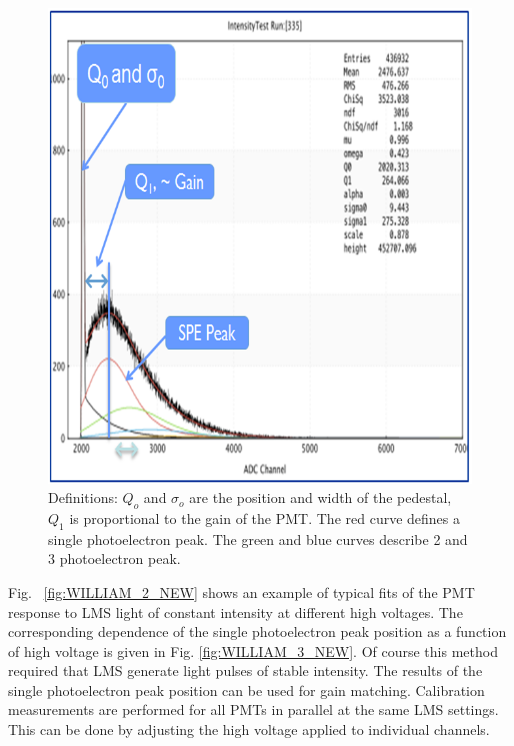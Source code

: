 \begin{figure}[!h]
    \centering
    \includegraphics[width=1.0\linewidth,trim={0.0cm 0.0cm 0.0cm 0.0cm},clip]{images/WILLIAM_1.png}
    \caption{Definitions: $Q_{o}$ and $\sigma_{o}$ are the position and width of the pedestal, $Q_{ 1}$ is proportional to the gain of the PMT. The red curve defines a single photoelectron peak. The green and blue curves describe 2 and 3 photoelectron peak.}
    \label{fig:WILLIAM_1}
\end{figure}

Fig. ~\ref{fig:WILLIAM_2_NEW} shows an example of typical fits of the PMT response to LMS light of constant intensity at different high voltages. The corresponding dependence of the single photoelectron peak position as a function of high voltage is given in Fig. \ref{fig:WILLIAM_3_NEW}. Of course this method required that LMS generate light pulses of stable intensity. The results of the single photoelectron peak position can be used for gain matching. Calibration measurements are performed for all PMTs in parallel at the same LMS settings. This can be done by adjusting the high voltage applied to individual channels.

